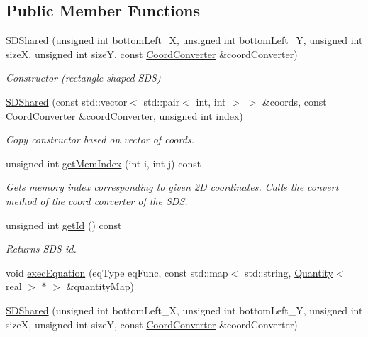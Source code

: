 \subsection*{Public Member Functions}
\begin{DoxyCompactItemize}
\item 
\hyperlink{classSDShared_a51004922c9fbb3f46dd5533dd95a3c12}{S\+D\+Shared} (unsigned int bottom\+Left\+\_\+X, unsigned int bottom\+Left\+\_\+Y, unsigned int sizeX, unsigned int sizeY, const \hyperlink{classCoordConverter}{Coord\+Converter} \&coord\+Converter)
\begin{DoxyCompactList}\small\item\em Constructor (rectangle-\/shaped S\+DS) \end{DoxyCompactList}\item 
\mbox{\label{classSDShared_afc8718fef97226eed215c34e1b453503}} 
\hyperlink{classSDShared_afc8718fef97226eed215c34e1b453503}{S\+D\+Shared} (const std\+::vector$<$ std\+::pair$<$ int, int $>$ $>$ \&coords, const \hyperlink{classCoordConverter}{Coord\+Converter} \&coord\+Converter, unsigned int index)
\begin{DoxyCompactList}\small\item\em Copy constructor based on vector of coords. \end{DoxyCompactList}\item 
unsigned int \hyperlink{classSDShared_a2418c837fb19a0997ca61e4b8bd65597}{get\+Mem\+Index} (int i, int j) const
\begin{DoxyCompactList}\small\item\em Gets memory index corresponding to given 2D coordinates. Calls the convert method of the coord converter of the S\+DS. \end{DoxyCompactList}\item 
unsigned int \hyperlink{classSDShared_ab3a51f6ef83b411b8839a7953af5257d}{get\+Id} () const
\begin{DoxyCompactList}\small\item\em Returns S\+DS id. \end{DoxyCompactList}\item 
void \hyperlink{classSDShared_afc27ac7db0bcb8177f54bb5a682606c1}{exec\+Equation} (eq\+Type eq\+Func, const std\+::map$<$ std\+::string, \hyperlink{classQuantity}{Quantity}$<$ real $>$ $\ast$ $>$ \&quantity\+Map)
\item 
\hyperlink{classSDShared_a51004922c9fbb3f46dd5533dd95a3c12}{S\+D\+Shared} (unsigned int bottom\+Left\+\_\+X, unsigned int bottom\+Left\+\_\+Y, unsigned int sizeX, unsigned int sizeY, const \hyperlink{classCoordConverter}{Coord\+Converter} \&coord\+Converter)

\end{DoxyCompactItemize}

